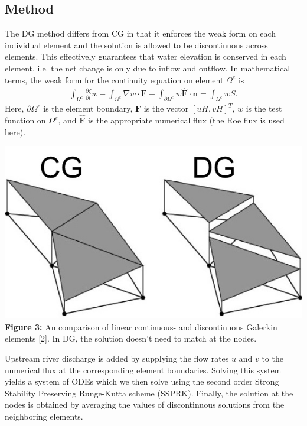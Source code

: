 \documentclass[american]{article}
\newcommand\pd[2]{\frac{\partial #1}{\partial #2}}
\newcommand\inte{\int_{\Omega^e}}
\newcommand\pinte{\int_{\partial\Omega^e}}
\newcommand\ve[1]{\mathbf{#1}}
\begin{document}
\begin{multicols}{3}
\section*{Method}
\noindent The DG method differs from CG in that it enforces the weak form on each individual element and the solution is allowed to be discontinuous across elements. This effectively guarantees that water elevation is conserved in each element, i.e. the net change is only due to inflow and outflow. In mathematical terms, the weak form for the continuity equation on element $\Omega^e$ is
\begin{align*}
  \inte \pd{\zeta}{t} w - \inte \nabla w \cdot \ve{F} + \pinte w \ve{\widehat{F}} \cdot \ve{n}  = \inte w S.
\end{align*}
Here, $\partial \Omega^e$ is the element boundary, $\ve{F}$ is the vector $[uH, vH]^T$, $w$ is the test function on $\Omega^e$, and $\ve{\widehat{F}}$ is the appropriate numerical flux (the Roe flux is used here).
\begin{center}
  \vspace{5mm}
    \includegraphics[width=0.55 \linewidth]{media/DG_CG.jpg} \\
    \textbf{Figure 3:} An comparison of linear continuous- and discontinuous Galerkin elements [2]. In DG, the solution doesn't need to match at the nodes.
\end{center}
Upstream river discharge is added by supplying the flow rates $u$ and $v$ to the numerical flux at the corresponding element boundaries.
Solving this system yields a system of ODEs which we then solve using the second order Strong Stability Preserving Runge-Kutta scheme (SSPRK).
Finally, the solution at the nodes is obtained by averaging the values of discontinuous solutions from the neighboring elements.



\end{multicols}
\end{document}
